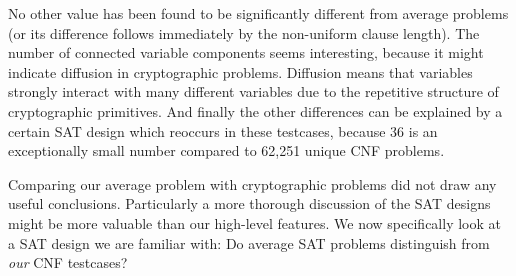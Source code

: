 No other value has been found to be significantly different from
average problems (or its difference follows immediately by the
non-uniform clause length). The number of connected variable
components seems interesting, because it might indicate diffusion
in cryptographic problems. Diffusion means that variables strongly
interact with many different variables due to the repetitive
structure of cryptographic primitives. And finally the other
differences can be explained by a certain SAT design which
reoccurs in these testcases, because 36 is an exceptionally small
number compared to 62,251 unique CNF problems.

Comparing our average problem with cryptographic problems did
not draw any useful conclusions. Particularly a more thorough discussion
of the SAT designs might be more valuable than our high-level features.
We now specifically look at a SAT design we are familiar with:
Do average SAT problems distinguish from \emph{our} CNF testcases?


